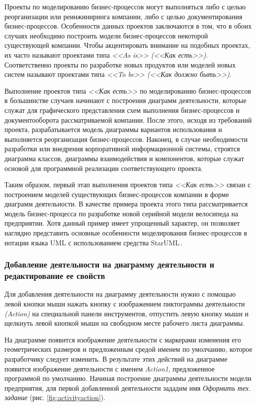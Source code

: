 \documentclass[a4paper,12pt]{report}
\newcommand{\staruml}{StarUML\,\tm}
\begin{document}
Проекты по моделированию бизнес-процессов могут выполняться либо с целью реорганизации или реинжиниринга компании, либо с целью документирования бизнес-процессов. Особенности данных проектов заключаются в том, что в обоих случаях необходимо построить модели бизнес-процессов некоторой существующей компании. Чтобы акцентировать внимание на подобных проектах, их часто называют проектами типа \textit{<<As is>> (<<Как есть>>)}. Соответственно проекты по разработке новых продуктов или моделей новых систем называют проектами типа \textit{<<To be>>} \textit{(<<Как должно быть>>)}.

Выполнение проектов типа\textit{ <<Как есть>>} по моделированию бизнес-процессов в большинстве случаев начинают с построения диаграмм деятельности, которые служат для графического представления схем выполнения бизнес-процессов и документооборота рассматриваемой компании. После этого, исходя из требований проекта, разрабатывается модель диаграммы вариантов использования и выполняется реорганизация бизнес-процессов. Наконец, в случае необходимости разработки или внедрения корпоративной информационной системы, строятся диаграмма классов, диаграммы взаимодействия и компонентов, которые служат основой для программной реализации соответствующего проекта.

Таким образом, первый этап выполнения проектов типа \textit{<<Как есть>>} связан с построением моделей существующих бизнес-процессов компании в форме диаграмм деятельности. В качестве примера проекта этого типа рассматривается модель бизнес-процесса по разработке новой серийной модели велосипеда на предприятии. Хотя данный пример имеет упрощенный характер, он позволяет наглядно представить основные особенности моделирования бизнес-процессов в нотации языка UML с использованием средства \staruml.

\subsubsection*{Добавление деятельности на диаграмму деятельности и редактирование ее свойств}
Для добавления деятельности на диаграмму деятельности нужно с помощью левой кнопки мыши нажать кнопку с изображением пиктограммы деятельности \textit{(Action)} на специальной панели инструментов, отпустить левую кнопку мыши и щелкнуть левой кнопкой мыши на свободном месте рабочего листа диаграммы. 

На диаграмме появится изображение деятельности с маркерами изменения его геометрических размеров и предложенным средой именем по умолчанию, которое разработчику следует изменить. В результате этих действий на диаграмме появится изображение деятельности с именем \textit{Action1}, предложенное программой по умолчанию. Начиная построение диаграммы деятельности модели предприятия, для первой добавленной деятельности зададим имя \textit{Оформить тех. задание} (рис. \ref{fig:activityaction}).
\end{document}
